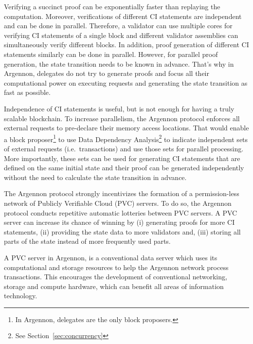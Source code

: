 Verifying a succinct proof can be exponentially faster than replaying the computation. Moreover, verifications of
different CI statements are independent and can be done in parallel. Therefore, a validator can use multiple cores for
verifying CI statements of a single block and different validator assemblies can simultaneously verify different blocks.
In addition, proof generation of different CI statements similarly can be done in parallel. However, for parallel
proof generation, the state transition needs to be known in advance. That's why in Argennon, delegates do not try
to generate proofs and focus all their computational power on executing requests and generating the state transition
as fast as possible.


Independence of CI statements is useful, but is not enough for having a truly scalable blockchain. To increase
parallelism, the Argennon protocol enforces all external requests to pre-declare their memory access locations. That
would enable a block proposer\footnote{In Argennon, delegates are the only block proposers.} to use Data Dependency
Analysis\footnote{See Section~\ref{sec:concurrency}} to indicate independent sets of external requests (i.e.\
transactions) and use those sets for parallel processing. More importantly, these sets can be used for generating CI
statements that
are defined on the same initial state and their proof can be generated independently without the need to calculate
the state transition in advance.

The Argennon protocol strongly incentivizes the formation of a permission-less network of Publicly Verifiable
Cloud (PVC) servers. To do so, the Argennon protocol conducts repetitive automatic lotteries between PVC servers.
A PVC server can increase its chance of winning by (i) generating proofs for more CI statements, (ii) providing the
state data to more validators and, (iii) storing all parts of the state instead of more frequently used parts.

A PVC server in Argennon, is a conventional data server which uses its computational and
storage resources to help the Argennon network process transactions. This encourages the development
of conventional networking, storage and compute hardware, which can benefit all areas of information technology.
